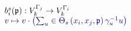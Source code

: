 \documentclass[12pt]{article}
\begin{document}
\makeatletter
\renewcommand*{\@textcolor}[3]{%
  \protect\leavevmode
  \begingroup
    \color#1{#2}#3%
  \endgroup
}
\makeatother
\begin{displaymath}
\begin{array}{l}
b_{i}^{s}(\mathfrak{p}): \mathcolor[RGB]{0,0,15}{V_{k}^{\Gamma_{j}}} \mathcolor[RGB]{0,0,30}{\rightarrow} \mathcolor[RGB]{0,0,45}{V_{k}^{\Gamma_{i}}} \mathcolor[RGB]{0,0,60}{\\
v} \mathcolor[RGB]{0,0,75}{\mapsto} \mathcolor[RGB]{0,0,90}{v} \mathcolor[RGB]{0,0,105}{\cdot\left(\sum_{u} \mathcolor[RGB]{0,0,120}{\in} \mathcolor[RGB]{0,0,135}{\Theta_{s}\left(x_{i},} \mathcolor[RGB]{0,0,150}{x_{j},} \mathcolor[RGB]{0,0,165}{\mathfrak{p}\right)}} \mathcolor[RGB]{0,0,180}{\gamma_{u}^{-1}} \mathcolor[RGB]{0,0,195}{u\right)
\end{array}}
\end{displaymath}
\end{document}
